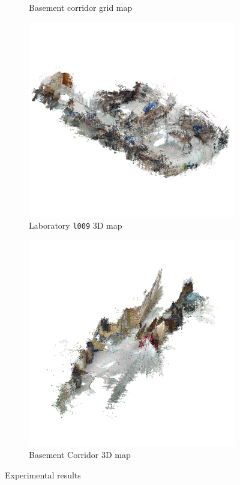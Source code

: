 \begin{figure}[H]
\begin{subfigure}[b]{0.45\textwidth}
    \caption{Basement corridor grid map}
    \label{fig:results_corridor2d}
  \end{subfigure}
  \begin{subfigure}[b]{0.49\textwidth}
    \centering
    \includegraphics[width=\textwidth]{imgs/isolab.png}
    \caption{Laboratory \texttt{l009} 3D map}
    \label{fig:results_lab3d}
  \end{subfigure}
  \begin{subfigure}[b]{0.49\textwidth}
    \centering
    \includegraphics[width=\textwidth]{imgs/isocorri.png}
    \caption{Basement Corridor 3D map}
    \label{fig:results_corridor3d}
  \end{subfigure}
  \caption{Experimental results}
  \label{fig:results}
\end{figure}



